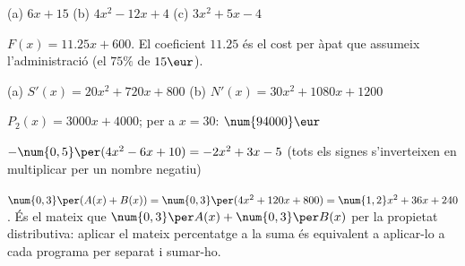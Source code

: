 \begin{solucions}
\begin{sollist}
  \item (a) $6x+15$ \quad (b) $4x^2-12x+4$ \quad (c) $3x^2+5x-4$
  \item $F(x)=\num{11,25}x+600$. El coeficient $\num{11,25}$ és el cost
        per àpat que assumeix l'administració (el $75\%$ de $15\eur$).
  \item (a) $S'(x)=20x^2+720x+800$ \quad
        (b) $N'(x)=30x^2+\num{1080}x+\num{1200}$
  \item $P_2(x)=\num{3000}x+\num{4000}$; \; per a $x=30$: $\num{94000}\eur$
  \item $-\num{0,5}\per(4x^2-6x+10) = -2x^2+3x-5$
        (tots els signes s'inverteixen en multiplicar per un nombre negatiu)
  \item $\num{0,3}\per(A(x)+B(x))=\num{0,3}\per(4x^2+120x+800)=\num{1,2}x^2+36x+240$.
        És el mateix que $\num{0,3}\per A(x)+\num{0,3}\per B(x)$ per la
        propietat distributiva: aplicar el mateix percentatge a la suma és
        equivalent a aplicar-lo a cada programa per separat i sumar-ho.
\end{sollist}
\end{solucions}
